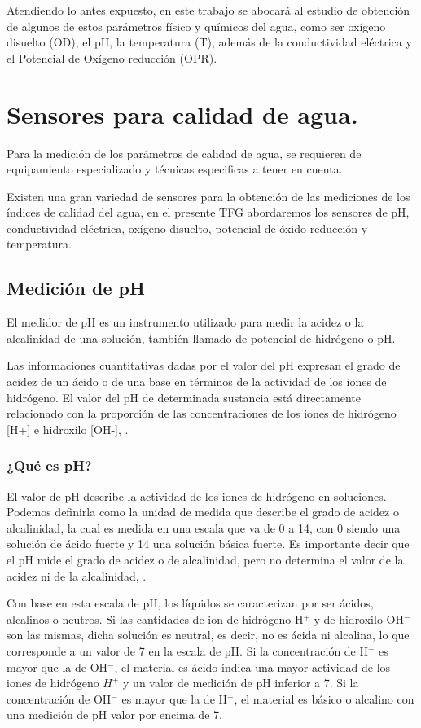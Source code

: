 Atendiendo lo antes expuesto, en este trabajo se abocar\'a al estudio de obtenci\'on de algunos de estos par\'ametros f\'isico y qu\'imicos del agua, como ser ox\'igeno disuelto (OD), el pH, la temperatura (T), adem\'as de la conductividad el\'ectrica y el Potencial de Ox\'igeno reducci\'on (OPR). 
\section{Sensores para calidad de agua.}
Para la medici\'on de los par\'ametros de calidad de agua, se requieren de equipamiento especializado y t\'ecnicas especificas a tener en cuenta.

Existen una gran variedad de sensores para la obtención de las mediciones de los \'indices de calidad del agua, en el presente TFG abordaremos los sensores de pH, conductividad el\'ectrica, ox\'igeno disuelto, potencial de óxido reducción y temperatura. 
\subsection{Medición de pH}
El medidor de pH es un instrumento utilizado para medir la acidez o la alcalinidad de una solución, también llamado de potencial de hidrógeno o pH. 

Las informaciones cuantitativas dadas por el valor del pH expresan el grado de acidez de un \'acido o de una base en t\'erminos de la actividad de los iones de hidr\'ogeno. El valor del pH de determinada sustancia est\'a directamente relacionado con la proporci\'on de las concentraciones de los iones de hidrógeno [H+] e hidroxilo [OH-], \cite{omega_medidores_nodate}.

\subsubsection{¿Qué es pH?}
El valor de pH describe la actividad de los iones de hidrógeno en soluciones. Podemos definirla como la unidad de medida que describe el grado de acidez o alcalinidad, la cual es medida en una escala que va de 0 a 14, con 0 siendo una solución de ácido fuerte y 14 una solución básica fuerte. Es importante decir que el pH mide el grado de acidez o de alcalinidad, pero no determina el valor de la acidez ni de la alcalinidad, \cite{sierra_ramirez_calidad_2011}. 

Con base en esta escala de pH, los líquidos se caracterizan por ser ácidos, alcalinos o neutros. Si las cantidades de ion de hidr\'ogeno H$^{+}$ y de hidroxilo OH$^{-}$ son las mismas, dicha solución es neutral, es decir, no es ácida ni alcalina, lo que corresponde a un valor de 7 en la escala de pH. 
Si la concentración de H$^{+}$ es mayor que la de OH$^{-}$, el material es ácido indica una mayor actividad de los iones de hidrógeno $H^{+}$ y un valor de medición de pH inferior a 7. 
Si la concentración de OH$^{-}$ es mayor que la de H$^{+}$, el material es básico o alcalino con una medición de pH valor por encima de 7.

